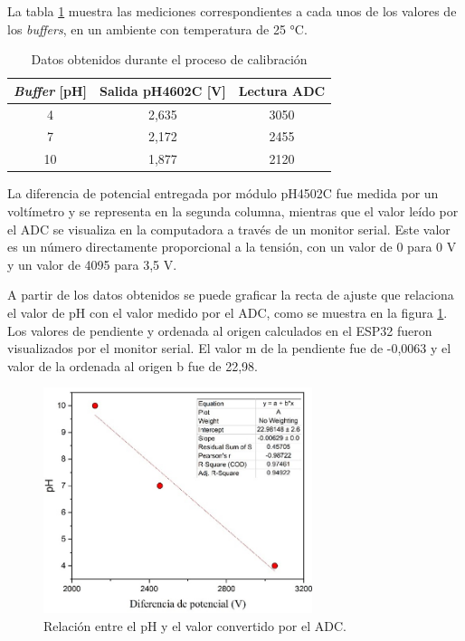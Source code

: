La tabla \ref{tab:ensayoCalibracion} muestra las mediciones correspondientes a cada unos de los valores de los \textit{buffers}, en un ambiente con temperatura de 25 °C. 

\begin{table}[h]
	\centering
	\caption[Resultados calibración]{Datos obtenidos durante el proceso de calibración}
	\begin{tabular}{c c c }    
		\toprule
		\textbf{\textit{Buffer} [pH]} & \textbf{Salida pH4602C [V] }	&    \textbf{Lectura ADC}  \\
		\midrule
		4 	& 2,635 & 3050 \\		
		7	& 2,172 & 2455 \\
		10	& 1,877 & 2120 \\
		\bottomrule
		\hline
	\end{tabular}
	\label{tab:ensayoCalibracion}
\end{table}

La diferencia de potencial entregada por módulo pH4502C fue medida por un voltímetro y se representa en la segunda columna, mientras que el valor leído por el ADC se visualiza en la computadora a través de un monitor serial. Este valor es un número directamente proporcional a la tensión, con un valor de 0 para 0 V y un valor de 4095 para 3,5 V.

A partir de los datos obtenidos se puede graficar la recta de ajuste que relaciona el valor de pH con el valor medido por el ADC, como se muestra en la figura \ref{fig:rectaADC}. Los valores de pendiente y ordenada al origen calculados en el ESP32 fueron visualizados por el monitor serial. El valor m de la pendiente fue de -0,0063 y el valor de la ordenada al origen b fue de 22,98. 

\begin{figure}[htbp]
	\centering
	\includegraphics[width=0.7\textwidth]{./Figures/rectaADC.jpg}
	\caption{Relación entre el pH y el valor convertido por el ADC.}
	\label{fig:rectaADC}
\end{figure}

